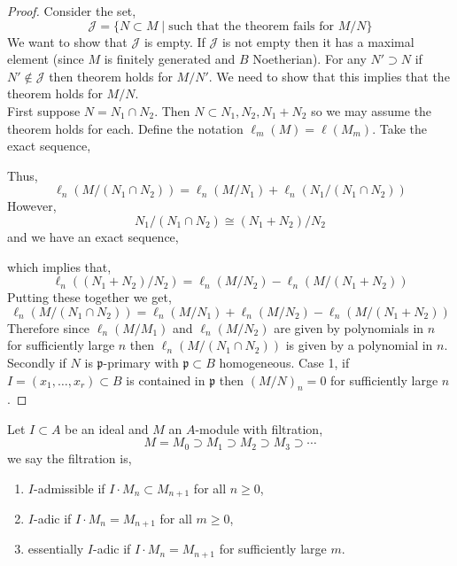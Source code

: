 \documentclass[12pt]{article}
\newcommand{\p}{\mathfrak{p}}
\theoremstyle{remark}
\theoremstyle{definition}
\newenvironment{definition}[1][Definition:]{\begin{trivlist}
\item[\hskip \labelsep {\bfseries #1}]}{\end{trivlist}}
\begin{document}
\begin{proof}
Consider the set,
\[ \mathcal{J} = \{ N \subset M \mid \text{such that the theorem fails for } M / N \} \]
We want to show that $\mathcal{J}$ is empty. If $\mathcal{J}$ is not empty then it has a maximal element (since $M$ is finitely generated and $B$ Noetherian). For any $N' \supset N$ if $N' \notin \mathcal{J}$ then theorem holds for $M / N'$. We need to show that this implies that the theorem holds for $M / N$. 
\bigskip\\
First suppose $N = N_1 \cap N_2$. Then $N \subset N_1, N_2, N_1 + N_2$ so we may assume the theorem holds for each.
Define the notation $\ell_m(M) = \ell(M_m)$. Take the exact sequence,
\begin{center}
\end{center}
Thus,
\[ \ell_n(M / (N_1 \cap N_2)) = \ell_n(M/N_1) + \ell_n(N_1 / (N_1 \cap N_2)) \]
However,
\[ N_1 / (N_1 \cap N_2) \cong (N_1 + N_2) / N_2 \] and we have an exact sequence,
\begin{center}
\end{center}
which implies that,
\[ \ell_n((N_1 + N_2) / N_2) = \ell_n(M / N_2) - \ell_n(M / (N_1 + N_2)) \]
Putting these together we get,
\[ \ell_n(M/(N_1 \cap N_2)) = \ell_n(M / N_1) + \ell_n(M / N_2) - \ell_n(M / (N_1 + N_2)) \]
Therefore since $\ell_n(M / M_1)$ and $\ell_n(M / N_2)$ are given by polynomials in $n$ for sufficiently large $n$ then $\ell_n(M / (N_1 \cap N_2))$ is given by a polynomial in $n$. 
\bigskip\\
Secondly if $N$ is $\p$-primary with $\p \subset B$ homogeneous. Case 1, if $I = (x_1, \dots, x_r) \subset B$ is contained in $\p$ then $(M / N)_n = 0$ for sufficiently large $n$. 
\end{proof}

\begin{definition}
Let $I \subset A$ be an ideal and $M$ an $A$-module with filtration,
\[ M = M_0 \supset M_1 \supset M_2 \supset M_3 \supset \cdots \]  
we say the filtration is,
\begin{enumerate}
\item $I$-admissible if $I \cdot M_n \subset M_{n+1}$ for all $n \ge 0$,

\item $I$-adic if $I \cdot M_n = M_{n+1}$ for all $m \ge 0$,

\item essentially $I$-adic if $I \cdot M_n = M_{n+1}$ for sufficiently large $m$.
\end{enumerate} 
\end{definition}
\end{document}

